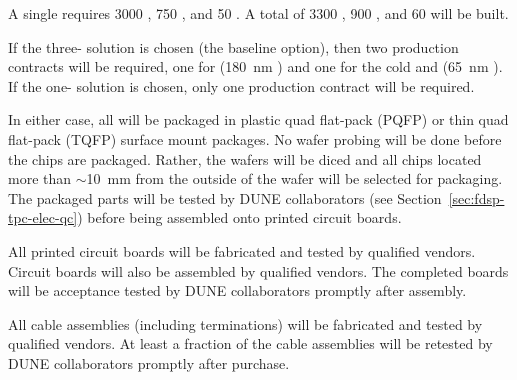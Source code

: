 A single  requires \num{3000} , \num{750} , and \num{50} .  A total of \num{3300} , \num{900} , and \num{60}  will be built.

If the three-  solution is chosen (the baseline option), then two  production contracts will be required, one for  (\SI{180}{nm} ) and one for the cold  and  (\SI{65}{nm} ).  If the one-  solution is chosen, only one  production contract will be required.

In either case, all  will be packaged in plastic quad flat-pack (PQFP) or thin quad flat-pack (TQFP) surface mount packages.  No wafer probing will be done before the chips are packaged.  Rather, the wafers will be diced and all chips located more than $\sim$\SI{10}{mm} from the outside of the wafer will be selected for packaging.  The packaged parts will be tested by DUNE collaborators (see Section~\ref{sec:fdsp-tpc-elec-qc}) before being assembled onto printed circuit boards.

All printed circuit boards will be fabricated and tested by qualified vendors. Circuit boards will also be assembled by qualified vendors.  The completed boards will be acceptance tested by DUNE collaborators promptly after assembly.

All cable assemblies (including terminations) will be fabricated and tested by qualified vendors.  At least a fraction of the cable assemblies will be retested by DUNE collaborators promptly after purchase.

